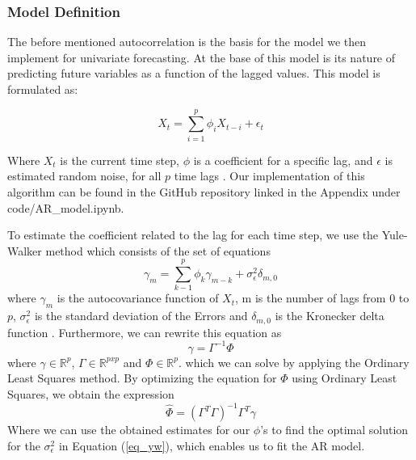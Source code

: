 \documentclass
[twocolumn,
secnumarabic,
nobibnotes,
aps,
prl,
reprint,
groupedaddress,
amsmath,
amssymb,
]{revtex4-2}
\begin{document}
\subsubsection{Model Definition}

The before mentioned autocorrelation is the basis for the model we then implement for univariate forecasting. At the base of this model is its nature of predicting future variables as a function of the lagged values. This model is formulated as:

\begin{equation}
  \label{eq_ar}
X_t = \sum_{i=1}^{p} \phi_i X_{t-i} + \epsilon_{t}
\end{equation}

Where $X_t$ is the current time step, $\phi$ is a coefficient for a specific lag, and $\epsilon$ is estimated random noise, for all $p$ time lags \cite{Korstanje2021}. Our implementation of this algorithm can be found in the GitHub repository linked in the Appendix under code/AR\_model.ipynb. 

To estimate the coefficient related to the lag for each time step, we use the Yule-Walker method which consists of the set of equations
\begin{equation}
  \label{eq_yw}
  \gamma_m = \sum_{k-1}^p\phi_k\gamma_{m-k} + \sigma_\epsilon^2\delta_{m,0}
\end{equation}
where $\gamma_m$ is the autocovariance function of $X_t$, m is the number of lags from 0 to $p$, $\sigma_\epsilon^2$ is the standard deviation of the Errors and $\delta_{m,0}$ is the Kronecker delta function \cite{Korstanje2021}. Furthermore, we can rewrite this equation as
\begin{equation}
  \nonumber
  \gamma = \Gamma^{-1}\Phi
\end{equation}
where $\gamma \in \mathbb{R}^p$, $\Gamma \in \mathbb{R}^{pxp}$ and $\Phi \in \mathbb{R}^p$. 
which we can solve by applying the Ordinary Least Squares method. By optimizing the equation for $\Phi$ using Ordinary Least Squares, we obtain the expression
\begin{equation}
  \nonumber
  \hat{\Phi} = \left(\Gamma^T\Gamma\right)^{-1}\Gamma^T\gamma
\end{equation}
Where we can use the obtained estimates for our $\phi$'s to find the optimal solution for the $\sigma_\epsilon^2$ in Equation (\ref{eq_yw}), which enables us to fit the AR model.
\end{document}
